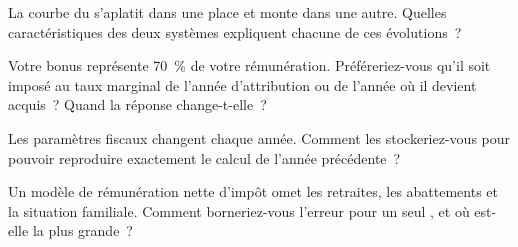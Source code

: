 \begin{interviewq}\label{iq:in:pay-regulation-and-tax-by-location:3}
La courbe du  s'aplatit dans une place et monte dans une autre. Quelles caractéristiques des deux systèmes expliquent chacune de ces évolutions~?
\end{interviewq}

\begin{interviewq}\label{iq:in:pay-regulation-and-tax-by-location:4}
Votre bonus représente 70~\% de votre rémunération. Préféreriez-vous qu'il soit imposé au taux marginal de l'année d'attribution ou de l'année où il
devient acquis~? Quand la réponse change-t-elle~?
\end{interviewq}

\begin{interviewq}\label{iq:in:pay-regulation-and-tax-by-location:5}
Les paramètres fiscaux changent chaque année. Comment les stockeriez-vous pour pouvoir reproduire exactement le calcul de l'année précédente~?
\end{interviewq}

\begin{interviewq}\label{iq:in:pay-regulation-and-tax-by-location:6}
Un modèle de rémunération nette d'impôt omet les retraites, les abattements et la situation familiale. Comment borneriez-vous l'erreur pour un seul
, et où est-elle la plus grande~?
\end{interviewq}
